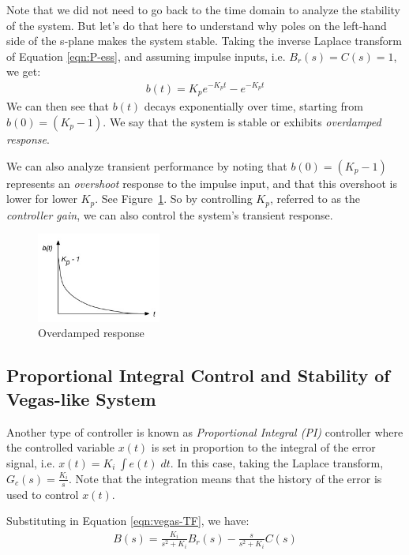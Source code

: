 \documentclass{article}
\begin{document}
Note that we did not need to go back to the time domain to analyze the stability of the system.
But let's do that here to understand why poles on the  left-hand side of the s-plane makes the system stable.
Taking the inverse Laplace transform of  Equation \ref{eqn:P-ess}, and assuming impulse inputs,
i.e. $B_r(s) = C(s) = 1$, we get:
\begin{eqnarray*}
b(t) = K_p e^{-K_p t} - e^{-K_p t}
\end{eqnarray*}
We can then see that $b(t)$ decays exponentially over time, starting from $b(0)=(K_p-1)$.
We say that the system is stable or exhibits {\em overdamped response}.

We can also analyze transient performance by noting that
$b(0)=(K_p-1)$ represents an {\em overshoot} response to the impulse input,
and that this overshoot is lower for lower $K_p$.
See Figure~\ref{fig:overdamped}.
So by controlling $K_p$, referred to as the {\em controller gain},
we can also control the system's transient response.

\begin{figure}[htbp] %
   \centering
   \includegraphics[width=1.6in]{figures/overdamped.jpg} 
   \caption{Overdamped response}
   \label{fig:overdamped}
\end{figure}

\subsection{Proportional Integral Control and Stability of Vegas-like System}

Another type of controller is known as {\em Proportional Integral (PI)} controller where
the controlled variable $x(t)$ is set in proportion to the integral of the error signal,
i.e. $x(t) = K_i\ \int e(t) \; dt$.
In this case, 
taking the Laplace transform, $G_c(s) = \frac{K_i}{s}$. 
Note that the integration means that the history of the error is used to control $x(t)$.

Substituting in Equation \ref{eqn:vegas-TF}, we have:
\begin{eqnarray}
B(s) = \frac{K_i}{s^2 + K_i} B_r(s) - \frac{s}{s^2 + K_i} C(s)
\label{eqn:PI-ess}
\end{eqnarray}
\end{document}
